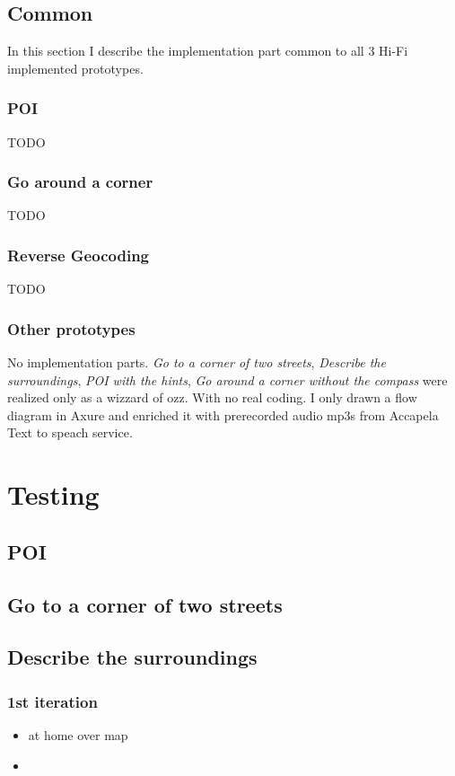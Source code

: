 \documentclass[11pt,oneside,a4paper]{book}
\begin{document}
		\section{Common}
			In this section I describe the implementation part common to all 3 Hi-Fi implemented prototypes.
		
		
		\subsection{POI}
			TODO		
		\subsection{Go around a corner}
			TODO
		\subsection{Reverse Geocoding}
			TODO
			
		\subsection{Other prototypes}
			No implementation parts.
			\emph{Go to a corner of two streets}, 
			\emph{Describe the surroundings},
			\emph{POI with the hints},
			\emph{Go around a corner without the compass}
			 were realized only as a wizzard of ozz. With no real coding. I only drawn a flow diagram in Axure and enriched it with prerecorded audio mp3s from Accapela Text to speach service.
	\chapter{Testing}
		\section{POI}		
		\section{Go to a corner of two streets}		
		\section{Describe the surroundings}
			\subsection{1st iteration}
				\begin{itemize}
					\item at home over map
					\item 
				\end{itemize}
\end{document}
